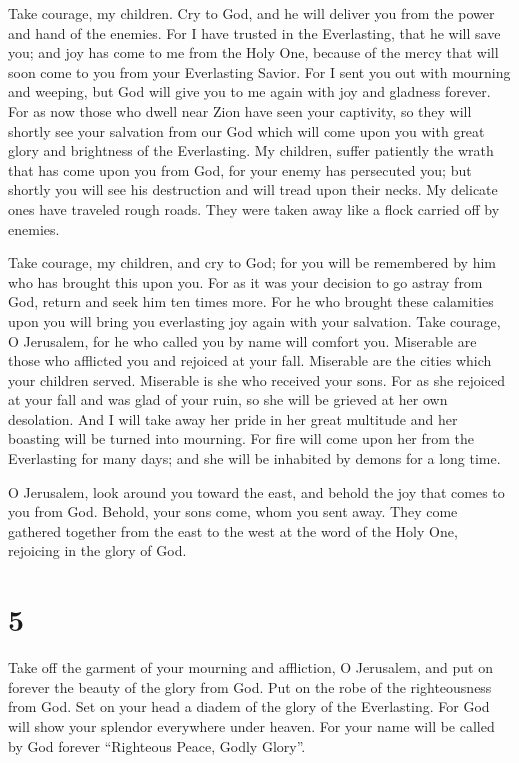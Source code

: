  Take courage, my children. Cry to God, and he will deliver
you from the power and hand of the enemies.  For I have
trusted in the Everlasting, that he will save you; and joy has come to
me from the Holy One, because of the mercy that will soon come to you
from your Everlasting Savior.  For I sent you out with
mourning and weeping, but God will give you to me again with joy and
gladness forever.  For as now those who dwell near Zion
have seen your captivity, so they will shortly see your salvation from
our God which will come upon you with great glory and brightness of the
Everlasting.  My children, suffer patiently the wrath that
has come upon you from God, for your enemy has persecuted you; but
shortly you will see his destruction and will tread upon their necks.
 My delicate ones have traveled rough roads. They were
taken away like a flock carried off by enemies.

 Take courage, my children, and cry to God; for you will be
remembered by him who has brought this upon you.  For as it
was your decision to go astray from God, return and seek him ten times
more.  For he who brought these calamities upon you will
bring you everlasting joy again with your salvation.  Take
courage, O Jerusalem, for he who called you by name will comfort you.
 Miserable are those who afflicted you and rejoiced at your
fall.  Miserable are the cities which your children served.
Miserable is she who received your sons.  For as she
rejoiced at your fall and was glad of your ruin, so she will be grieved
at her own desolation.  And I will take away her pride in
her great multitude and her boasting will be turned into mourning.
 For fire will come upon her from the Everlasting for many
days; and she will be inhabited by demons for a long time.

 O Jerusalem, look around you toward the east, and behold
the joy that comes to you from God.  Behold, your sons
come, whom you sent away. They come gathered together from the east to
the west at the word of the Holy One, rejoicing in the glory of God.

\hypertarget{section-4}{%
\section{5}\label{section-4}}

 Take off the garment of your mourning and affliction, O
Jerusalem, and put on forever the beauty of the glory from God.
 Put on the robe of the righteousness from God. Set on your
head a diadem of the glory of the Everlasting.  For God will
show your splendor everywhere under heaven.  For your name
will be called by God forever ``Righteous Peace, Godly Glory''.

